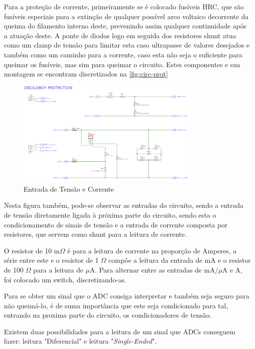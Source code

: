 Para a proteção de corrente, primeiramente se é colocado fusíveis \gls{HRC}, que são fusíveis especiais para a extinção de qualquer possível arco voltaico decorrente da queima do filamento interno deste, prevenindo assim qualquer continuidade após a atuação deste. A ponte de diodos logo em seguida dos resistores shunt atua como um clamp de tensão para limitar esta caso ultrapasse de valores desejados e também como um caminho para a corrente, caso esta não seja o suficiente para queimar os fusíveis, mas sim para queimar o circuito. Estes componentes e sua montagem se encontram discretizados na \autoref{fig:circ-prot}

\begin{figure}[htb!]
    \caption{Entrada de Tensão e Corrente}
    \label{fig:circ-prot}
    \includegraphics[width=0.8\textwidth]{figuras/circ-prot.png}
    \fonte{}
\end{figure}

Nesta figura também, pode-se observar as entradas do circuito, sendo a entrada de tensão diretamente ligada à próxima parte do circuito, sendo esta o condicionamento de sinais de tensão e a entrada de corrente composta por resistores, que servem como shunt para a leitura de corrente.

O resistor de 10 m$\Omega$ é para a leitura de corrente na proporção de Amperes, a série entre este e o resistor de 1 $\Omega$ compõe a leitura da entrada de mA e o resistor de 100 $\Omega$ para a leitura de $\mu$A. Para alternar entre as entradas de mA/$\mu$A e A, foi colocado um switch, discretizando-as.

Para se obter um sinal que o ADC consiga interpretar e também seja seguro para não queimá-lo, é de suma importância que este seja condicionado para tal, entrando na proxima parte do circuito, os condicionadores de tensão.

Existem duas possibilidades para a leitura de um sinal que \gls{ADC}s conseguem fazer: leitura "Diferencial" e leitura "\textit{Single-Ended}".

